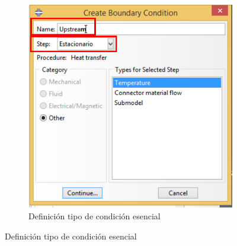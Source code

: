 \begin{figure}[!h]
\begin{subfigure}[!h]{0.45\textwidth}
      \includegraphics[width=\textwidth]{./body/images/load03.pdf}
      \caption{Definición tipo de condición esencial}
      \label{load03}
    \end{subfigure}%


\end{figure}
